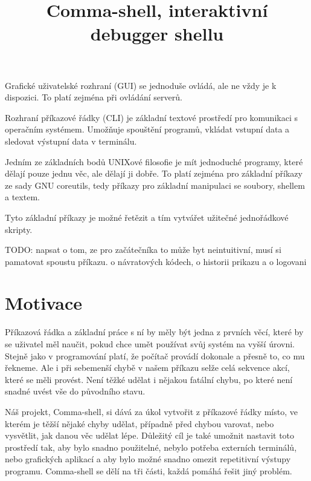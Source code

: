 \documentclass[thesis=M,czech]{FITthesis}[2012/06/26]
\title{Comma-shell, interaktivní debugger shellu}
\begin{document}
\lstset{basicstyle=\footnotesize\ttfamily,breaklines=true,showstringspaces=false,captionpos=b}
\renewcommand{\lstlistingname}{Ukázka}




\begin{introduction}

Grafické uživatelské rozhraní (GUI) se jednoduše ovládá, ale ne vždy je k dispozici. To platí zejména při ovládání serverů.

Rozhraní příkazové řádky (CLI) je základní textové prostředí pro komunikaci s operačním systémem. Umožňuje spouštění programů, vkládat vstupní data a sledovat výstupní data v terminálu.

Jedním ze základních bodů UNIXové filosofie je mít jednoduché programy, které dělají pouze jednu věc, ale dělají ji dobře. To platí zejména pro základní příkazy ze sady GNU coreutils, tedy příkazy pro základní manipulaci se soubory, shellem a textem.

Tyto základní příkazy je možné řetězit a tím vytvářet užitečné jednořádkové skripty.

TODO: napsat o tom, ze pro začátečníka to může byt neintuitivní, musí si pamatovat spoustu příkazu. o návratových kódech, o historii prikazu a o logovani


\section{Motivace}

Příkazová řádka a základní práce s ní by měly být jedna z prvních věcí, které by se uživatel měl naučit, pokud chce umět používat svůj systém na vyšší úrovni. Stejně jako v programování platí, že počítač provádí dokonale a přesně to, co mu řekneme. Ale i při sebemenší chybě v našem příkazu selže celá sekvence akcí, které se měli provést. Není těžké udělat i nějakou fatální chybu, po které není snadné uvést vše do původního stavu.

Náš projekt, Comma-shell, si dává za úkol vytvořit z příkazové řádky místo, ve kterém je těžší nějaké chyby udělat, případně před chybou varovat, nebo vysvětlit, jak danou věc udělat lépe. Důležitý cíl je také umožnit nastavit toto prostředí tak, aby bylo snadno použitelné, nebylo potřeba externích terminálů, nebo grafických aplikací a aby bylo možné snadno omezit repetitivní výstupy programu. Comma-shell se dělí na tři části, každá pomáhá řešit jiný problém.


\end{introduction}
\end{document}
